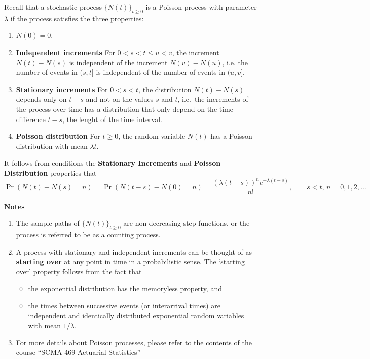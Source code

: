 \documentclass[landscape, 20pt]{extreport}
\theoremstyle{definition}
\theoremstyle{definition}
\theoremstyle{definition}
\theoremstyle{definition}
\theoremstyle{remark}
\begin{document}
Recall that a stochastic process \(\{N(t) \}_{t \ge 0}\) is a Poisson
process with parameter \(\lambda\) if the process satisfies the three
properties:

\begin{enumerate}
\def\labelenumi{\arabic{enumi}.}
\item
  \(N(0) = 0\).
\item
  \textbf{Independent increments} For \(0 < s < t \le u < v\), the increment
  \(N(t) - N(s)\) is independent of the increment \(N(v) - N(u)\), i.e.
  the number of events in \((s,t]\) is independent of the number of
  events in \((u,v]\).
\item
  \textbf{Stationary increments} For
  \(0 < s <t\), the distribution \(N(t) - N(s)\) depends only on \(t -s\)
  and not on the values \(s\) and \(t\), i.e.~the increments of the
  process over time has a distribution that only depend on the time
  difference \(t - s\), the lenght of the time interval.
\item
  \textbf{Poisson distribution} For
  \(t \ge 0\), the random variable \(N(t)\) has a Poisson distribution
  with mean \(\lambda t\).
\end{enumerate}

It follows from conditions the \textbf{Stationary Increments} and \textbf{Poisson Distribution} properties that
\[\Pr(N(t) - N(s) = n) = \Pr(N(t-s) - N(0) = n) =  \frac{ ( \lambda(t-s))^n e^{-\lambda(t-s)} }{n!},  \quad \quad s < t, \, n = 0,1,2, \ldots\]

\textbf{Notes}

\begin{enumerate}
\def\labelenumi{\arabic{enumi}.}
\item
  The sample paths of \(\{N(t) \}_{t \ge 0}\) are non-decreasing step
  functions, or the process is referred to be as a counting process.
\item
  A process with stationary and independent increments can be thought
  of as \textbf{starting over} at any point in time in a probabilistic
  sense. The `starting over' property follows from the fact that

  \begin{itemize}
  \item
    the exponential distribution has the memoryless property, and
  \item
    the times between successive events (or interarrival times) are
    independent and identically distributed exponential random
    variables with mean \(1/\lambda\).
  \end{itemize}
\item
  For more details about Poisson processes, please refer to the
  contents of the course ``SCMA 469 Actuarial Statistics''
\end{enumerate}
\end{document}
